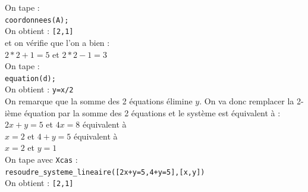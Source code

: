 \documentclass[a4paper,11pt]{book}
\begin{document}
On tape :\\
{\tt coordonnees(A);}\\
On obtient : {\tt [2,1]}\\
et on v\'erifie que l'on a bien :\\
$2*2+1=5$ et $2*2-1=3$\\
On tape :\\
{\tt equation(d);}\\
On obtient : {\tt y=x/2}\\
On remarque que la somme des 2 
\'equations \'elimine $y$. On va donc remplacer la 2-i\`eme \'equation par la 
somme des 2 \'equations et le syst\`eme est \'equivalent \`a :\\
$2x+y=5$ et $4x=8$ \'equivalent \`a\\
$x=2$ et $4+y=5$ \'equivalent \`a\\
$x=2$ et $y=1$ \\
On tape avec {\tt Xcas} :\\
{\tt resoudre\_systeme\_lineaire([2x+y=5,4+y=5],[x,y])}\\
On obtient : {\tt [2,1]}
\end{document}
